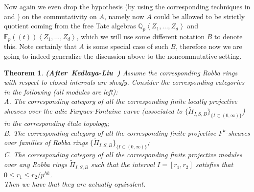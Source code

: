 \documentclass[12pt]{amsart}
\newtheorem{theorem}{Theorem}[section]
\theoremstyle{definition}
\numberwithin{equation}{section}
\begin{document}



\indent Now again we even drop the hypothesis (by using the corresponding techniques in \cite{XT3} and \cite{XT4}) on the commutativity on $A$, namely now $A$ could be allowed to be strictly quotient coming from the free Tate algebras $\mathbb{Q}_p\left<Z_1,...,Z_d\right>$ and $\mathbb{F}_p((t))\left<Z_1,...,Z_d\right>$, which we will use some different notation $B$ to denote this. Note certainly that $A$ is some special case of such $B$, therefore now we are going to indeed generalize the discussion above to the noncommutative setting.



  	 


\begin{theorem}\mbox{\bf{(After Kedlaya-Liu \cite[Theorem 4.6.1]{KL2})}}
Assume the corresponding Robba rings with respect to closed intervals are sheafy. Consider the corresponding categories in the following (all modules are left):\\
A. The corresponding category of all the corresponding finite locally projective sheaves over the adic Fargues-Fontaine curve (associated to $\{\widetilde{\Pi}_{I,S,B}\}_{\{I\subset (0,\infty)\}}$) in the corresponding \'etale topology;\\
B. The corresponding category of all the corresponding finite projective $F^k$-sheaves over families of Robba rings $\{\widetilde{\Pi}_{I,S,B}\}_{\{I\subset (0,\infty)\}}$;\\
C. The corresponding category of all the corresponding finite projective modules over any Robba rings $\widetilde{\Pi}_{I,S,B}$ such that the interval $I=[r_1,r_2]$ satisfies that $0\leq r_1 \leq r_2/p^{hk}$.\\
Then we have that they are actually equivalent.


\end{theorem}
\end{document}
